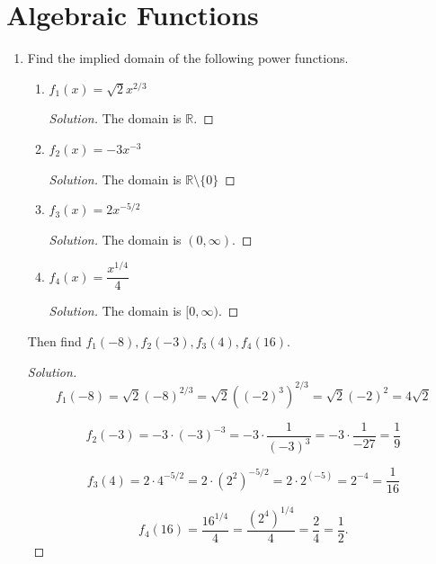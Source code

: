 \documentclass[12pt]{article}
\newenvironment{solution}{\begin{proof}[Solution]}{\end{proof}}
\begin{document}
	\newpage
	
	\section{Algebraic Functions}
	\begin{enumerate}
		
		\item Find the implied domain of the following power functions.
		\begin{enumerate}
			\item $f_1(x)=\sqrt{2}x^{2/3}$
			\begin{solution}
				The domain is $\mathbb{R}$.
			\end{solution}
			\item $f_2(x)=-3x^{-3}$
			\begin{solution}
				The domain is $\mathbb{R}\setminus \{0\}$
			\end{solution}
			\item $f_3(x)=2x^{-5/2}$
			\begin{solution}
				The domain is $(0,\infty)$.
			\end{solution}
			\item $f_4(x)=\dfrac{x^{1/4}}{4}$
			\begin{solution}
				The domain is $[0,\infty)$.
			\end{solution}
		\end{enumerate}
		Then find $f_1(-8), f_2(-3), f_3(4), f_4(16)$.
		\begin{solution}
			$$f_1(-8)=\sqrt{2}(-8)^{2/3}=\sqrt{2}((-2)^3)^{2/3}=\sqrt{2} (-2)^2=4\sqrt{2}$$
			
			$$f_2(-3)=-3\cdot(-3)^{-3}=-3\cdot \dfrac{1}{(-3)^3}=-3\cdot \dfrac{1}{-27}=\dfrac{1}{9}$$
			
			$$f_3(4)=2\cdot 4^{-5/2}=2\cdot (2^2)^{-5/2}=2\cdot 2^{(-5)}=2^{-4}=\dfrac{1}{16}$$
			
			$$f_4(16)=\dfrac{16^{1/4}}{4}=\dfrac{(2^4)^{1/4}}{4}=\dfrac{2}{4}=\dfrac{1}{2}.$$
		\end{solution}
		

\end{enumerate}
\end{document}

